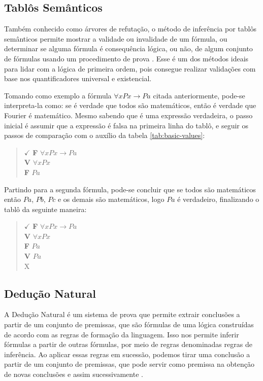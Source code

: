 \subsection{Tablôs Semânticos}

Também conhecido como árvores de refutação, o método de inferência por tablôs semânticos permite mostrar a validade ou invalidade de um fórmula, ou determinar se alguma fórmula é consequência lógica, ou não, de algum conjunto de fórmulas usando um procedimento de prova \cite{mortari2001}. Esse é um dos métodos ideais para lidar com a lógica de primeira ordem, pois consegue realizar validações com base nos quantificadores universal e existencial. 

Tomando como exemplo a fórmula $\forall xPx \rightarrow Pa$ citada anteriormente, pode-se interpreta-la como: se é verdade que todos são matemáticos, então é verdade que Fourier é matemático. Mesmo sabendo que é uma expressão verdadeira, o passo inicial é assumir que a expressão é falsa na primeira linha do tablô, e seguir os passos de comparação com o auxílio da tabela \ref{tab:basic-values}:

\begin{quote}\centering
    $\checkmark$ \textbf{F} $\forall xPx \rightarrow Pa$ \\
    \textbf{V} $\forall xPx$ \\
    \textbf{F} $Pa$
\end{quote}

Partindo para a segunda fórmula, pode-se concluir que se todos são matemáticos então $Pa$, $Pb$, $Pc$ e os demais são matemáticos, logo $Pa$ é verdadeiro, finalizando o tablô da seguinte maneira: 

\begin{quote}\centering
    $\checkmark$ \textbf{F} $\forall xPx \rightarrow Pa$ \\
    \textbf{V} $\forall xPx$ \\
    \textbf{F} $Pa$ \\
    \textbf{V} $Pa$ \\
    X
\end{quote}

\subsection{Dedução Natural}

A Dedução Natural é um sistema de prova que permite extrair conclusões a partir de um conjunto de premissas, que são fórmulas de uma lógica construídas de acordo com as regras de formação da linguagem. Isso nos permite inferir fórmulas a partir de outras fórmulas, por meio de regras denominadas regras de inferência. Ao aplicar essas regras em sucessão, podemos tirar uma conclusão a partir de um conjunto de premissas, que pode servir como premissa na obtenção de novas conclusões e assim sucessivamente \cite{huth2004logic}.

